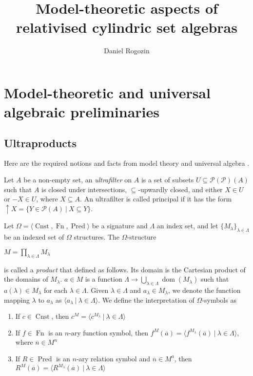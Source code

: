 \documentclass[a4paper]{article}
\author{Daniel Rogozin}
\date{}
\title{Model-theoretic aspects of relativised cylindric set algebras}
\theoremstyle{defin}
\theoremstyle{theorem}
\theoremstyle{prop}
\theoremstyle{lemma}
\theoremstyle{ex}
\theoremstyle{col}
\begin{document}
\maketitle

\nocite{*}

\section{Model-theoretic and universal algebraic preliminaries}

\subsection{Ultraproducts}

Here are the required notions and facts from model theory and universal algebra \cite{hirsch2002relation} \cite{hodges1997shorter} \cite{sankappanavar1981course}.

Let $A$ be a non-empty set, an \emph{ultrafilter} on $A$ is a set of subsets $U \subseteq \mathcal{P}(\mathcal{P})(A)$ such that $A$ is closed under intersections, $\subseteq$-upwardly closed, and either $X \in U$ or $- X \in U$, where $X \subseteq A$. An ultrafilter is called principal if it has the form $\uparrow X = \{ Y \in \mathcal{P}(A) \: | \: X \subseteq Y \}$.

Let $\Omega = \langle \operatorname{Cnst}, \operatorname{Fn}, \operatorname{Pred} \rangle$ be a signature and $\Lambda$ an index set, and let $\{ M_{\lambda}\}_{\lambda \in \Lambda}$ be an indexed set of $\Omega$ structures. The $\Omega$-structure
\begin{center}
  $M = \prod \limits_{\lambda \in \Lambda} M_{\lambda}$
\end{center}
is called a \emph{product} that defined as follows. Its domain is the Cartesian product of the domains of $M_{\lambda}$. $a \in M$ is a function $\Lambda \to \bigcup \limits_{\lambda \in \Lambda} \operatorname{dom}(M_{\lambda})$ such that $a(\lambda) \in M_{\lambda}$ for each $\lambda \in \Lambda$.
Given $\lambda \in \Lambda$ and $a_{\lambda} \in M_{\lambda}$, we denote the function mapping $\lambda$ to $a_{\lambda}$ as
$\langle a_{\lambda} \: | \: \lambda \in \Lambda \rangle$. We define the interpretation of $\Omega$-symbols as

\begin{enumerate}
  \item If $c \in \operatorname{Cnst}$, then $c^{M} = \langle c^{M_{\lambda}} \: | \: \lambda \in \Lambda \rangle$
  \item If $f \in \operatorname{Fn}$ is an $n$-ary function symbol, then $f^{M}(\overline{a}) = \langle f^{M_{\lambda}}(\overline{a}) \: | \: \lambda \in \Lambda \rangle$, where $\overline{n} \in M^{n}$
  \item If $R \in \operatorname{Pred}$ is an $n$-ary relation symbol and $\overline{n} \in M^{a}$, then $R^{M}(\overline{a}) = \langle R^{M_{\lambda}}(\overline{a}) \: | \: \lambda \in \Lambda \rangle$
\end{enumerate}
\end{document}
